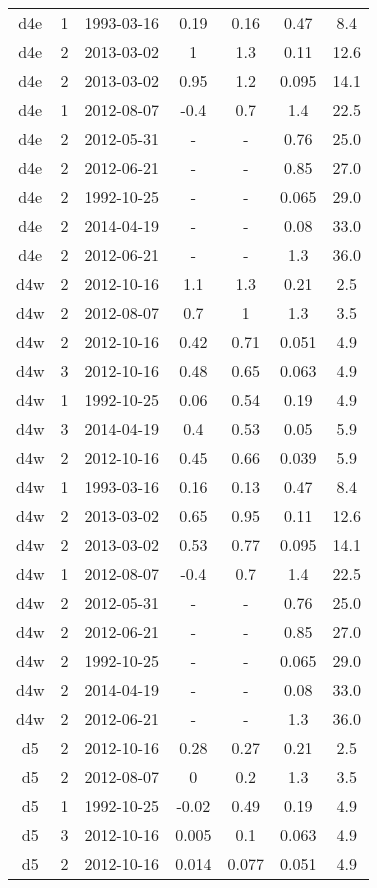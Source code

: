 \begin{table*}[htp]
\begin{tabular}{ccccccc}
d4e & 1 & 1993-03-16 & 0.19 & 0.16 & 0.47 & 8.4 \\
d4e & 2 & 2013-03-02 & 1 & 1.3 & 0.11 & 12.6 \\
d4e & 2 & 2013-03-02 & 0.95 & 1.2 & 0.095 & 14.1 \\
d4e & 1 & 2012-08-07 & -0.4 & 0.7 & 1.4 & 22.5 \\
d4e & 2 & 2012-05-31 & - & - & 0.76 & 25.0 \\
d4e & 2 & 2012-06-21 & - & - & 0.85 & 27.0 \\
d4e & 2 & 1992-10-25 & - & - & 0.065 & 29.0 \\
d4e & 2 & 2014-04-19 & - & - & 0.08 & 33.0 \\
d4e & 2 & 2012-06-21 & - & - & 1.3 & 36.0 \\
d4w & 2 & 2012-10-16 & 1.1 & 1.3 & 0.21 & 2.5 \\
d4w & 2 & 2012-08-07 & 0.7 & 1 & 1.3 & 3.5 \\
d4w & 2 & 2012-10-16 & 0.42 & 0.71 & 0.051 & 4.9 \\
d4w & 3 & 2012-10-16 & 0.48 & 0.65 & 0.063 & 4.9 \\
d4w & 1 & 1992-10-25 & 0.06 & 0.54 & 0.19 & 4.9 \\
d4w & 3 & 2014-04-19 & 0.4 & 0.53 & 0.05 & 5.9 \\
d4w & 2 & 2012-10-16 & 0.45 & 0.66 & 0.039 & 5.9 \\
d4w & 1 & 1993-03-16 & 0.16 & 0.13 & 0.47 & 8.4 \\
d4w & 2 & 2013-03-02 & 0.65 & 0.95 & 0.11 & 12.6 \\
d4w & 2 & 2013-03-02 & 0.53 & 0.77 & 0.095 & 14.1 \\
d4w & 1 & 2012-08-07 & -0.4 & 0.7 & 1.4 & 22.5 \\
d4w & 2 & 2012-05-31 & - & - & 0.76 & 25.0 \\
d4w & 2 & 2012-06-21 & - & - & 0.85 & 27.0 \\
d4w & 2 & 1992-10-25 & - & - & 0.065 & 29.0 \\
d4w & 2 & 2014-04-19 & - & - & 0.08 & 33.0 \\
d4w & 2 & 2012-06-21 & - & - & 1.3 & 36.0 \\
d5 & 2 & 2012-10-16 & 0.28 & 0.27 & 0.21 & 2.5 \\
d5 & 2 & 2012-08-07 & 0 & 0.2 & 1.3 & 3.5 \\
d5 & 1 & 1992-10-25 & -0.02 & 0.49 & 0.19 & 4.9 \\
d5 & 3 & 2012-10-16 & 0.005 & 0.1 & 0.063 & 4.9 \\
d5 & 2 & 2012-10-16 & 0.014 & 0.077 & 0.051 & 4.9 \\

\end{tabular}
\end{table*}
